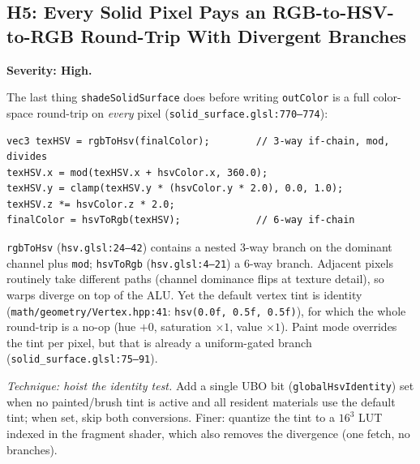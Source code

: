 \documentclass[11pt,a4paper]{article}
\begin{document}
\subsection{H5: Every Solid Pixel Pays an RGB-to-HSV-to-RGB Round-Trip With Divergent Branches}
\label{sec:h5}

\textbf{Severity: High.}

The last thing \texttt{shadeSolidSurface} does before writing
\texttt{outColor} is a full color-space round-trip on \emph{every} pixel
(\texttt{solid\_surface.glsl:770--774}):

\begin{lstlisting}[basicstyle=\footnotesize\ttfamily]
vec3 texHSV = rgbToHsv(finalColor);        // 3-way if-chain, mod, divides
texHSV.x = mod(texHSV.x + hsvColor.x, 360.0);
texHSV.y = clamp(texHSV.y * (hsvColor.y * 2.0), 0.0, 1.0);
texHSV.z *= hsvColor.z * 2.0;
finalColor = hsvToRgb(texHSV);             // 6-way if-chain
\end{lstlisting}

\texttt{rgbToHsv} (\texttt{hsv.glsl:24--42}) contains a nested 3-way branch on
the dominant channel plus \texttt{mod}; \texttt{hsvToRgb}
(\texttt{hsv.glsl:4--21}) a 6-way branch. Adjacent pixels routinely take
different paths (channel dominance flips at texture detail), so warps diverge
on top of the ALU. Yet the default vertex tint is identity
(\texttt{math/geometry/Vertex.hpp:41}: \texttt{hsv(0.0f, 0.5f, 0.5f)}), for which the
whole round-trip is a no-op (hue $+0$, saturation $\times 1$, value $\times
1$). Paint mode overrides the tint per pixel, but that is already a
uniform-gated branch (\texttt{solid\_surface.glsl:75--91}).

\textit{Technique: hoist the identity test.} Add a single UBO bit
(\texttt{globalHsvIdentity}) set when no painted/brush tint is active and all
resident materials use the default tint; when set, skip both conversions.
Finer: quantize the tint to a $16^3$ LUT indexed in the fragment shader, which
also removes the divergence (one fetch, no branches).
\end{document}
